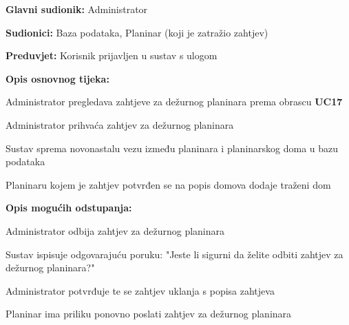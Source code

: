 		\noindent {}
		\begin{packed_item}
			
			\item \textbf{Glavni sudionik: }$ $Administrator$ $
			\item  \textbf{Sudionici:} $ $Baza podataka, Planinar (koji je zatražio zahtjev)$ $
			\item  \textbf{Preduvjet:} $ $Korisnik prijavljen u sustav s ulogom $ $
			\item  \textbf{Opis osnovnog tijeka:}
			
			\item[] \begin{packed_enum}
				
				\item $ $Administrator pregledava zahtjeve za dežurnog planinara prema obrascu \textbf{UC17} $ $
				\item $ $Administrator prihvaća zahtjev za dežurnog planinara$ $
				\item $ $Sustav sprema novonastalu vezu između planinara i planinarskog doma u bazu podataka$ $
				\item $ $Planinaru kojem je zahtjev potvrđen se na popis domova dodaje traženi dom$ $
				
				
			\end{packed_enum}
			\item  \textbf{Opis mogućih odstupanja:}
			
			\item[] \begin{packed_item}
				
				\item[1.a] $ $Administrator odbija zahtjev za dežurnog planinara$ $
				\item[] \begin{packed_enum}
					\item $ $Sustav ispisuje odgovarajuću poruku: "Jeste li sigurni da želite odbiti zahtjev za dežurnog planinara?" $ $
					  \item $ $Administrator potvrđuje te se zahtjev uklanja s popisa zahtjeva $ $ 
					\item $ $Planinar ima priliku ponovno poslati zahtjev za dežurnog planinara$ $
				\end{packed_enum}
			\end{packed_item}
		\end{packed_item} 
		
